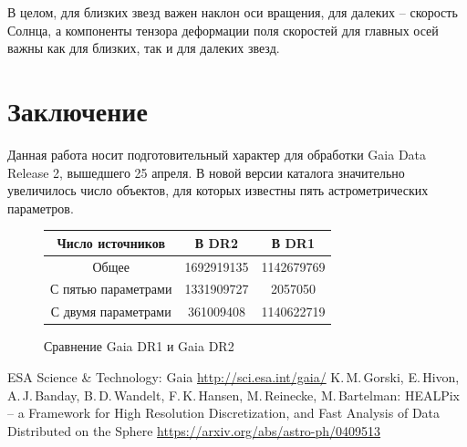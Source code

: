 \documentclass[14pt]{article} %
\begin{document}
В целом, для близких звезд важен наклон оси вращения, для далеких -- скорость Солнца, а компоненты тензора деформации поля скоростей для главных осей важны как для близких, так и для далеких звезд.
\section{Заключение}
Данная работа носит подготовительный характер для обработки Gaia Data Release 2, вышедшего 25 апреля. В новой версии каталога значительно увеличилось число объектов, для которых известны пять астрометрических параметров.
\begin{figure}[!h]
\begin{tabular}{|c|c|c|}
\hline
Число источников&В DR2&В DR1\\
\hline
Общее&1692919135&1142679769\\
С пятью параметрами&1331909727&2057050\\
С двумя параметрами&361009408&1140622719\\
\hline
\end{tabular}
\caption*{Сравнение Gaia DR1 и Gaia DR2}
\end{figure}
\newpage
\begin{thebibliography}{99}
ESA Science \& Technology: Gaia \url{http://sci.esa.int/gaia/}
K.\,M.\,Gorski, E.\,Hivon, A.\,J.\,Banday, B.\,D.\,Wandelt, F.\,K.\,Hansen, M.\,Reinecke, M.\,Bartelman: HEALPix -- a Framework for High Resolution Discretization, and Fast Analysis of Data Distributed on the Sphere \url{https://arxiv.org/abs/astro-ph/0409513}

\end{thebibliography}
\end{document}
